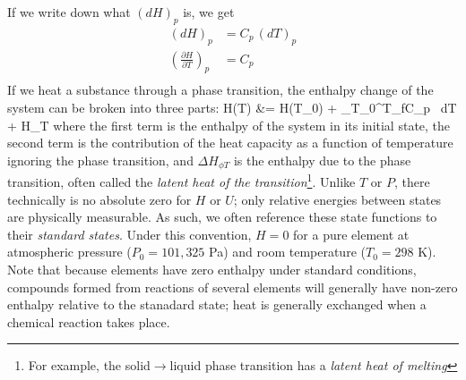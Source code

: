\documentclass[12pt]{article}
\begin{document}
If we write down what $(dH)_p$ is, we get
\begin{align*}
(dH)_p &= C_p \,(dT)_p\\
\left(\frac{\partial H}{\partial T}\right)_p &= C_p\\
\end{align*}
If we heat a substance through a phase transition, the enthalpy change of the system can be broken into three parts:
\eqs
H(T) &= H(T_0) +  \int_{T_0}^{T_f}C_p  \, dT + \Delta H_{\phi T}
\eqe
where the first term is the enthalpy of the system in its initial state, the second term is the contribution of the heat capacity as a function of temperature ignoring the phase transition, and $\Delta H_{\phi T}$ is the enthalpy due to the phase transition, often called the \emph{latent heat of the transition}\footnote{For example, the solid$\to$liquid phase transition has a \emph{latent heat of melting}}.  Unlike $T$ or $P$, there technically is no absolute zero for $H$ or $U$; only relative energies between states are physically measurable. As such, we often reference these state functions to their \emph{standard states}. Under this convention, $H=0$ for a pure element at atmospheric pressure ($P_0 = 101,325$ Pa) and room temperature ($T_0 = 298$ K). Note that because elements have zero enthalpy under standard conditions, compounds formed from reactions of several elements will generally have non-zero enthalpy relative to the stanadard state; heat is generally exchanged when a chemical reaction takes place.\\
\end{document}
